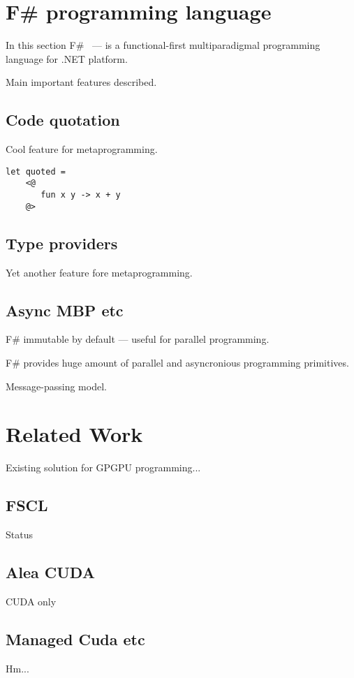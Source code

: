 \section{F\# programming language}

In this section F\#~\cite{fsharp} --- is a functional-first multiparadigmal programming language for .NET platform.

Main important features described.

\subsection{Code quotation}

Cool feature for metaprogramming.

\begin{lstlisting}[label=code_quotation_example,caption=Example of F\# code quotation]
let quoted = 
    <@
       fun x y -> x + y
    @>
\end{lstlisting}


\subsection{Type providers}

Yet another feature fore metaprogramming.

\subsection{Async MBP etc}

F\# immutable by default --- useful for parallel programming.

F\# provides huge amount of parallel and asyncronious programming primitives.

Message-passing model.

\section{Related Work}

Existing solution for GPGPU programming...

\subsection{FSCL}

Status~\cite{FSCLPhD}

\subsection{Alea CUDA}

CUDA only~\cite{AleaGPU}

\subsection{Managed Cuda etc}

Hm...